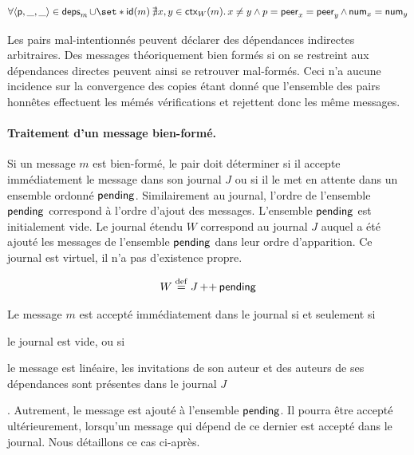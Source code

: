 \begin{equation}\label{eq:honest-verif}
    \forall \tuple*{\trm{p}, \_, \_} \in \trm{deps}_m \cup \set*{\trm{id}(m)} \:\nexists x, y \in \trm{ctx}_W(m) \qsep x \neq y \land p = \trm{peer}_x = \trm{peer}_y \land \trm{num}_x = \trm{num}_y
\end{equation}

\begin{remark}
Les pairs mal-intentionnés peuvent déclarer des dépendances indirectes arbitraires.
Des messages théoriquement bien formés si on se restreint aux dépendances directes peuvent ainsi se retrouver mal-formés.
Ceci n'a aucune incidence sur la convergence des copies étant donné que l'ensemble des pairs honnêtes effectuent les mémés vérifications et rejettent donc les même messages.
\end{remark}


\paragraph{Traitement d'un message bien-formé.} Si un message $m$ est bien-formé, le pair doit déterminer si il accepte immédiatement le message dans son journal $J$ ou si il le met en attente dans un ensemble ordonné $\operatorname{\mathsf{pending}}$.
Similairement au journal, l'ordre de l'ensemble $\operatorname{\mathsf{pending}}$ correspond à l'ordre d'ajout des messages.
L'ensemble $\operatorname{\mathsf{pending}}$ est initialement vide.
Le journal étendu $W$ correspond au journal $J$ auquel a été ajouté les messages de l'ensemble $\operatorname{\mathsf{pending}}$ dans leur ordre d'apparition.
Ce journal est virtuel, il n'a pas d'existence propre.

\begin{equation*}
    W \overset{\mathrm{def}}{=} J \operatorname{++} \operatorname{\mathsf{pending}}
\end{equation*}

Le message $m$ est accepté immédiatement dans le journal si et seulement si \begin{inlinelist}\item le journal est vide, ou si \item le message est linéaire, les invitations de son auteur et des auteurs de ses dépendances sont présentes dans le journal $J$\end{inlinelist}.
Autrement, le message est ajouté à l'ensemble $\operatorname{\mathsf{pending}}$.
Il pourra être accepté ultérieurement, lorsqu'un message qui dépend de ce dernier est accepté dans le journal.
Nous détaillons ce cas ci-après.

